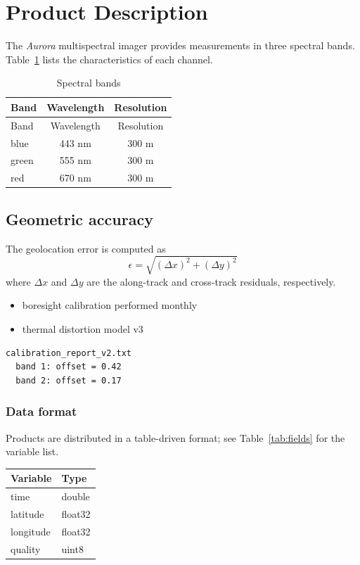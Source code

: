 \documentclass{article}
\begin{document}
\section{Product Description}

The \textit{Aurora} multispectral imager provides measurements in
three spectral bands. Table~\ref{tab:bands} lists the characteristics
of each channel.

\begin{longtable}{|l|c|c|}
\caption{Spectral bands}\label{tab:bands}\\
\hline
Band & Wavelength & Resolution\\
\hline
\endfirsthead
\hline
Band & Wavelength & Resolution\\
\hline
\endhead
blue   & 443 nm & 300 m\\
green  & 555 nm & 300 m\\
red    & 670 nm & 300 m\\
\hline
\end{longtable}

\subsection{Geometric accuracy}

The geolocation error is computed as
\begin{equation}
  \epsilon = \sqrt{(\Delta x)^2 + (\Delta y)^2}
\end{equation}
where $\Delta x$ and $\Delta y$ are the along-track and cross-track
residuals, respectively.

\begin{itemize}
\item boresight calibration performed monthly
\item thermal distortion model v3
\end{itemize}

\begin{verbatim}
calibration_report_v2.txt
  band 1: offset = 0.42
  band 2: offset = 0.17
\end{verbatim}

\subsubsection{Data format}\label{sec:format}

Products are distributed in a table-driven format; see
Table~\ref{tab:fields} for the variable list.

\begin{longtable}{|l|l|}
\hline
Variable & Type\\
\hline
time       & double\\
latitude   & float32\\
longitude  & float32\\
quality    & uint8\\
\hline
\end{longtable}
\end{document}
